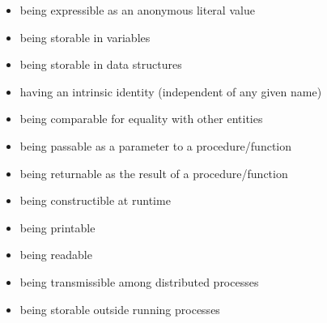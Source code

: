 \documentclass[11pt]{article}
\begin{document}
\begin{enumerate}
        \begin{itemize}
            \item being expressible as an anonymous literal value
            \item being storable in variables
            \item being storable in data structures
            \item having an intrinsic identity (independent of any given name)
            \item being comparable for equality with other entities
            \item being passable as a parameter to a procedure/function
            \item being returnable as the result of a procedure/function
            \item being constructible at runtime
            \item being printable
            \item being readable
            \item being transmissible among distributed processes
            \item being storable outside running processes
        \end{itemize}
    \end{enumerate}
\end{document}
